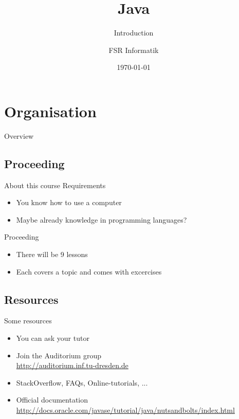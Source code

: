 
\usepackage{tikz}

\title{Java}
\subtitle{Introduction}
\author{FSR Informatik}
\date{\today}

\def\tikzoverlay{%
   \tikz[baseline,overlay]\node[every overlay node]
}%



\section{Organisation}
\begin{frame}
	\titlepage
\end{frame}
\begin{frame}{Overview}
	\tableofcontents
\end{frame}

\subsection{Proceeding}
\begin{frame}{About this course}
	Requirements
	\begin{itemize}
		\item You know how to use a computer
		\item Maybe already knowledge in programming languages?
	\end{itemize}
	Proceeding
	\begin{itemize}
		\item There will be 9 lessons
		\item Each covers a topic and comes with excercises
	\end{itemize}
\end{frame}

\subsection{Resources}
\begin{frame}{Some resources}
	\begin{itemize}
		\item You can ask your tutor
		\item Join the Auditorium group \hfill \\
			\url{http://auditorium.inf.tu-dresden.de}
		\item StackOverflow, FAQs, Online-tutorials, ... \hfill \\
		\item Official documentation \hfill \\
			\url{http://docs.oracle.com/javase/tutorial/java/nutsandbolts/index.html}
	\end{itemize}
\end{frame}

